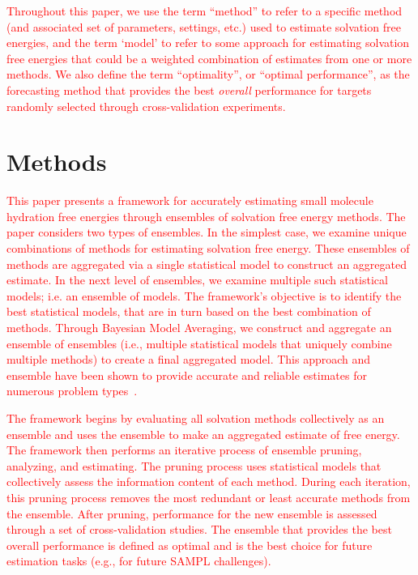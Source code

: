 \documentclass[journal=jpcbfk, manuscript=article]{achemso}
\newcommand{\+}[1]{\ensuremath{\mathbf{#1}}}
\newcommand{\rev}[1]{\textsf{\textcolor{red}{#1}}}
\begin{document}
\rev{Throughout this paper, we use the term ``method'' to refer to a specific method (and associated set of parameters, settings, etc.) used to estimate solvation free energies, and the term `model' to refer to some approach for estimating solvation free energies that could be a weighted combination of estimates from one or more methods.
We also define the term ``optimality'', or ``optimal performance'', as the forecasting method that provides the best \emph{overall} performance for targets randomly selected through cross-validation experiments.}

\section{Methods} \label{MethodMain}
\rev{This paper presents a framework for accurately  estimating  small molecule hydration free energies through ensembles of solvation free energy methods.
The paper considers two types of ensembles.
In the simplest case, we examine unique combinations of methods for estimating solvation free energy.
These ensembles of methods are aggregated via a single statistical model to construct an aggregated estimate. 
In the next level of ensembles, we examine multiple such statistical models; i.e. an ensemble of models. 
The framework's objective is to identify the best statistical models, that are in turn based on the best combination of methods.
Through Bayesian Model Averaging, we construct and aggregate an ensemble of ensembles (i.e., multiple statistical models that uniquely combine multiple methods) to create a final aggregated model.
This approach and ensemble have been shown to provide accurate and reliable estimates for numerous problem types~\cite{Gosink:2014, Zhang:2003, Bates:1969, Morales-Casique:2010, Opitz:1999, Rokach:2010, Hoeting:1999, Seni:2010, Raftery:2005, Vlachopoulo:2013, Seni:2010, Hoeting:1999, Raftery:1998, Raftery:1995}.}

\rev{The framework begins by evaluating all solvation methods collectively as an ensemble and uses the ensemble to make an aggregated estimate of free energy. 
The framework then performs an iterative process of ensemble pruning, analyzing, and estimating.
The pruning process uses statistical models that collectively assess the information content of each method.
During each iteration, this pruning process removes the most redundant or least accurate methods from the ensemble.
After pruning, performance for the new ensemble is assessed through a set of cross-validation studies.
The ensemble that provides the best overall performance is defined as optimal and is the best choice for future estimation tasks (e.g., for future SAMPL challenges).}
\end{document}
